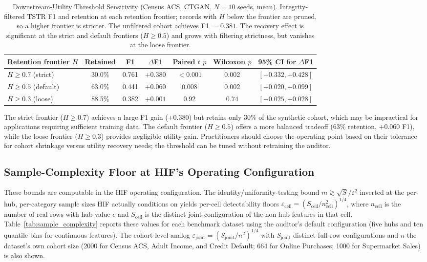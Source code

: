 \documentclass[pdflatex,sn-mathphys-num]{sn-jnl}
\theoremstyle{thmstyleone}%
\theoremstyle{thmstyletwo}%
\theoremstyle{thmstylethree}%
\begin{document}
\begin{appendices}
\begin{table}[htbp]
\centering
\caption{Downstream-Utility Threshold Sensitivity (Census ACS, CTGAN, $N=10$ seeds, mean). Integrity-filtered TSTR F1 and retention at each retention frontier; records with $H$ below the frontier are pruned, so a higher frontier is stricter. The unfiltered cohort achieves F1 $= 0.381$. The recovery effect is significant at the strict and default frontiers ($H \ge 0.5$) and grows with filtering strictness, but vanishes at the loose frontier.}
\label{tab:threshold_utility}
\footnotesize
\setlength{\tabcolsep}{3pt}
\begin{tabular}{@{}lcccccc@{}}
\toprule
Retention frontier $H$ & Retained & F1 & $\Delta$F1 & Paired $t$ $p$ & Wilcoxon $p$ & 95\% CI for $\Delta$F1 \\
\midrule
$H \geq 0.7$ (strict) & 30.0\% & 0.761 & $+0.380$ & $<0.001$ & 0.002 & $[+0.332, +0.428]$ \\
$H \geq 0.5$ (default) & 63.0\% & 0.441 & $+0.060$ & 0.008 & 0.002 & $[+0.020, +0.099]$ \\
$H \geq 0.3$ (loose) & 88.5\% & 0.382 & $+0.001$ & 0.92 & 0.74 & $[-0.025, +0.028]$ \\
\bottomrule
\end{tabular}
\end{table}

The strict frontier ($H \ge 0.7$) achieves a large F1 gain ($+0.380$) but retains only 30\% of the synthetic cohort, which may be impractical for applications requiring sufficient training data. The default frontier ($H \ge 0.5$) offers a more balanced tradeoff (63\% retention, $+0.060$ F1), while the loose frontier ($H \ge 0.3$) provides negligible utility gain. Practitioners should choose the operating point based on their tolerance for cohort shrinkage versus utility recovery needs; the threshold can be tuned without retraining the auditor.

\subsection{Sample-Complexity Floor at HIF's Operating Configuration}\label{app:sample_complexity}

These bounds are computable in the HIF operating configuration. The identity/uniformity-testing bound $m \gtrsim \sqrt{S}/\varepsilon^2$ \cite{paninski2008,valiant2014instance} inverted at the per-hub, per-category sample sizes HIF actually conditions on yields per-cell detectability floors $\varepsilon_{\text{cell}} = (S_{\text{cell}} / n_{\text{cell}}^2)^{1/4}$, where $n_{\text{cell}}$ is the number of real rows with hub value $c$ and $S_{\text{cell}}$ is the distinct joint configuration of the non-hub features in that cell. Table~\ref{tab:sample_complexity} reports these values for each benchmark dataset using the auditor's default configuration (five hubs and ten quantile bins for continuous features). The cohort-level analog $\varepsilon_{\text{joint}} = (S_{\text{joint}} / n^2)^{1/4}$ with $S_{\text{joint}}$ distinct full-row configurations and $n$ the dataset's own cohort size (2000 for Census ACS, Adult Income, and Credit Default; 664 for Online Purchases; 1000 for Supermarket Sales) is also shown.


\end{appendices}
\end{document}
